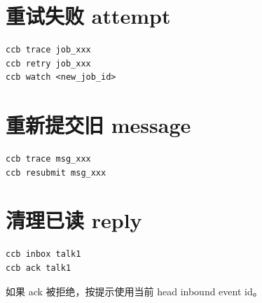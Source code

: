 \section{重试失败 attempt}

\begin{lstlisting}
ccb trace job_xxx
ccb retry job_xxx
ccb watch <new_job_id>
\end{lstlisting}

\section{重新提交旧 message}

\begin{lstlisting}
ccb trace msg_xxx
ccb resubmit msg_xxx
\end{lstlisting}

\section{清理已读 reply}

\begin{lstlisting}
ccb inbox talk1
ccb ack talk1
\end{lstlisting}

如果 ack 被拒绝，按提示使用当前 head inbound event id。
